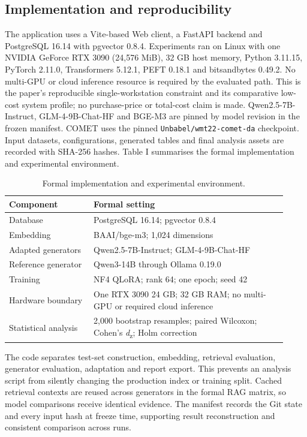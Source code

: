 \subsection{Implementation and reproducibility}

The application uses a Vite-based Web client, a FastAPI backend and PostgreSQL 16.14 with pgvector 0.8.4. Experiments ran on Linux with one NVIDIA GeForce RTX 3090 (24,576 MiB), 32 GB host memory, Python 3.11.15, PyTorch 2.11.0, Transformers 5.12.1, PEFT 0.18.1 and bitsandbytes 0.49.2. No multi-GPU or cloud inference resource is required by the evaluated path. This is the paper's reproducible single-workstation constraint and its comparative low-cost system profile; no purchase-price or total-cost claim is made. Qwen2.5-7B-Instruct, GLM-4-9B-Chat-HF and BGE-M3 are pinned by model revision in the frozen manifest. COMET uses the pinned \texttt{Unbabel/wmt22-comet-da} checkpoint. Input datasets, configurations, generated tables and final analysis assets are recorded with SHA-256 hashes. Table I summarises the formal implementation and experimental environment.

\begin{table}[ht]
\centering
\caption{Formal implementation and experimental environment.}

\begin{tabular}{p{0.28\linewidth}p{0.64\linewidth}}
\toprule
Component & Formal setting \\
\midrule
Database & PostgreSQL 16.14; pgvector 0.8.4 \\
Embedding & BAAI/bge-m3; 1,024 dimensions \\
Adapted generators & Qwen2.5-7B-Instruct; GLM-4-9B-Chat-HF \\
Reference generator & Qwen3-14B through Ollama 0.19.0 \\
Training & NF4 QLoRA; rank 64; one epoch; seed 42 \\
Hardware boundary & One RTX 3090 24 GB; 32 GB RAM; no multi-GPU or required cloud inference \\
Statistical analysis & 2,000 bootstrap resamples; paired Wilcoxon; Cohen's \emph{d}\textsubscript{z}; Holm correction \\
\bottomrule
\end{tabular}
\end{table}

The code separates test-set construction, embedding, retrieval evaluation, generator evaluation, adaptation and report export. This prevents an analysis script from silently changing the production index or training split. Cached retrieval contexts are reused across generators in the formal RAG matrix, so model comparisons receive identical evidence. The manifest records the Git state and every input hash at freeze time, supporting result reconstruction and consistent comparison across runs.

